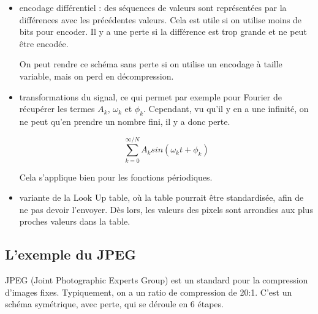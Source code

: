 		\begin{itemize}
			\item encodage différentiel : des séquences de valeurs sont représentées par la différences avec les précédentes valeurs. Cela est utile si on utilise moins de bits pour encoder. Il y a une perte si la différence est trop grande et ne peut être encodée.
			
			On peut rendre ce schéma sans perte si on utilise un encodage à taille variable, mais on perd en décompression.
			
			\item transformations du signal, ce qui permet par exemple pour Fourier de récupérer les termes $A_k$, $\omega_k$ et $\phi_k$. Cependant, vu qu'il y en a une infinité, on ne peut qu'en prendre un nombre fini, il y a donc perte.
			
			$$\sum_{k = 0}^{\infty / N} A_k sin(\omega_kt + \phi_k)$$
			
			Cela s'applique bien pour les fonctions périodiques.
			
			\item variante de la Look Up table, où la table pourrait être standardisée, afin de ne pas devoir l'envoyer. Dès lors, les valeurs des pixels sont arrondies aux plus proches valeurs dans la table.
		\end{itemize}
		
		
		\subsection{L'exemple du JPEG}
		
		JPEG (Joint Photographic Experts Group) est un standard pour la compression d'images fixes. Typiquement, on a un ratio de compression de 20:1. C'est un schéma symétrique, avec perte, qui se déroule en 6 étapes.
				
